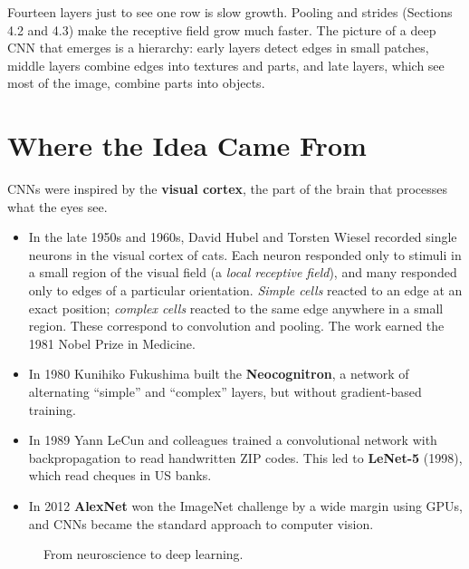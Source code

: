 \documentclass[12pt, a4paper]{article}
\begin{document}
Fourteen layers just to see one row is slow growth. Pooling and strides
(Sections 4.2 and 4.3) make the receptive field grow much faster. The
picture of a deep CNN that emerges is a hierarchy: early layers detect edges
in small patches, middle layers combine edges into textures and parts, and
late layers, which see most of the image, combine parts into objects.

\section{Where the Idea Came From}

CNNs were inspired by the \textbf{visual cortex}, the part of the brain that
processes what the eyes see.
\begin{itemize}
  \item In the late 1950s and 1960s, David Hubel and Torsten Wiesel recorded
        single neurons in the visual cortex of cats. Each neuron responded
        only to stimuli in a small region of the visual field (a
        \emph{local receptive field}), and many responded only to edges of a
        particular orientation. \emph{Simple cells} reacted to an edge at an
        exact position; \emph{complex cells} reacted to the same edge
        anywhere in a small region. These correspond to convolution and
        pooling. The work earned the 1981 Nobel Prize in Medicine.
  \item In 1980 Kunihiko Fukushima built the \textbf{Neocognitron}, a network
        of alternating ``simple'' and ``complex'' layers, but without
        gradient-based training.
  \item In 1989 Yann LeCun and colleagues trained a convolutional network with
        backpropagation to read handwritten ZIP codes. This led to
        \textbf{LeNet-5} (1998), which read cheques in US banks.
  \item In 2012 \textbf{AlexNet} won the ImageNet challenge by a wide margin
        using GPUs, and CNNs became the standard approach to computer vision.
\end{itemize}

\begin{figure}[H]
  \centering
  \caption{From neuroscience to deep learning.}
  \label{fig:timeline}
\end{figure}
\end{document}
